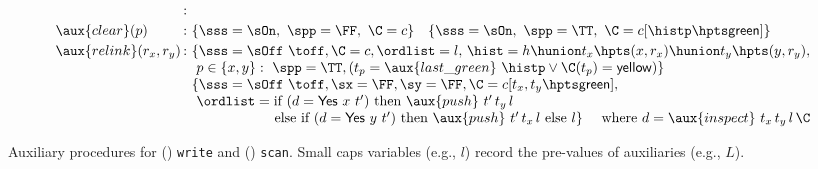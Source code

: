 {\begin{figure}[t]
\begin{subfigure}[b]{1\textwidth}
\[\begin{array}{l@{\, :\ }l}
\begin{array}[t]{l}
\end{array}\\[2.5pt]      
   \aux{clear}(p) &
      \{\sss = \sOn,\ \spp = \FF,\ \C = c \}\quad
      \{\sss = \sOn,\ \spp = \TT,\
      \C = c[\histp \hpts \mathsf{green}] \}\\[2.5pt]
   \aux{relink}(r_x, r_y) &
  \!\!\! \begin{array}[t]{l}
    \{\sss = \sOff\ \toff, \C = c, \ordlist = l,\, %
        \hist = h \hunion t_x \hpts (x, r_x) \hunion t_y \hpts (y, r_y),\\
      \ p \in \{x,y\}:\ \spp =\TT, (t_p = \aux{last\_green}\ \histp \vee
                \C(t_p) = \mathsf{yellow})\}\\
     \{\sss = \sOff\ \toff, \sx=\FF, \sy=\FF,%
        \C = c[t_x, t_y \hpts \mathsf{green}],\\
      \ \ordlist = \textrm{if}\ (d = \mathsf{Yes}\ x\ t')\
                \textrm{then}\ \aux{push}\ t'\, t_y\, l\\
                 \phantom{\ \ordlist =\ } \textrm{else\ if}\
                 (d = \mathsf{Yes}\ y\ t')\ \textrm{then}\
                 \aux{push}\ t'\, t_x\, l\ \textrm{else}\ l\}\
  \quad \mbox{where $d = \aux{inspect}\ t_x\, t_y\, l\, \C$}
  \end{array}
\end{array}
\]\vspace{-8mm}
\caption{\label{fig:scanauxcode}}
\end{subfigure}
\caption{\label{fig:auxcode} Auxiliary procedures for () {\tt write} and () {\tt scan}. Small caps variables (e.g., $l$) record the pre-values of auxiliaries (e.g., $L$).}
\end{figure}
}


